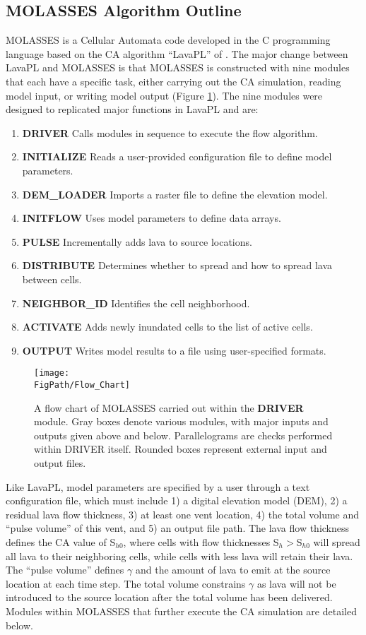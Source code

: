 	\subsection{MOLASSES Algorithm Outline}
		MOLASSES is a Cellular Automata code developed in the C programming language based on the CA algorithm ``LavaPL'' of \citet{connor2012}. The major change between LavaPL and MOLASSES is that MOLASSES is constructed with nine modules that each have a specific task, either carrying out the CA simulation, reading model input, or writing model output (Figure \ref{fig_flowchart}). The nine modules were designed to replicated major functions in LavaPL and are:
		\begin{enumerate}
			\item{\textbf{DRIVER}} Calls modules in sequence to execute the flow algorithm.
			\item{\textbf{INITIALIZE}} Reads a user-provided configuration file to define model parameters.
			\item{\textbf{DEM\_LOADER}} Imports a raster file to define the elevation model.
			\item{\textbf{INITFLOW}} Uses model parameters to define data arrays.
			\item{\textbf{PULSE}} Incrementally adds lava to source locations.
			\item{\textbf{DISTRIBUTE}} Determines whether to spread and how to spread lava between cells.
			\item{\textbf{NEIGHBOR\_ID}} Identifies the cell neighborhood.
			\item{\textbf{ACTIVATE}} Adds newly inundated cells to the list of active cells.
			\item{\textbf{OUTPUT}} Writes model results to a file using user-specified formats.
		\end{enumerate}
		
		\begin{figure}[!h]
			\centering
			\texttt{[image: \\FigPath/Flow\_Chart]}
			\caption[MOLASSES flow chart]{A flow chart of MOLASSES carried out within the \textbf{DRIVER} module. Gray boxes denote various modules, with major inputs and outputs given above and below. Parallelograms are checks performed within DRIVER itself. Rounded boxes represent external input and output files.}
			\label{fig_flowchart}
		\end{figure}
		
		
		Like LavaPL, model parameters are specified by a user through a text configuration file, which must include 1) a digital elevation model (DEM), 2) a residual lava flow thickness, 3) at least one vent location, 4) the total volume and ``pulse volume'' of this vent, and 5) an output file path. The lava flow thickness defines the CA value of S$_{h0}$, where cells with flow thicknesses S$_h>$S$_{h0}$ will spread all lava to their neighboring cells, while cells with less lava will retain their lava. The ``pulse volume'' defines $\gamma$ and the amount of lava to emit at the source location at each time step. The total volume constrains $\gamma$ as lava will not be introduced to the source location after the total volume has been delivered. Modules within MOLASSES that further execute the CA simulation are detailed below.
		
